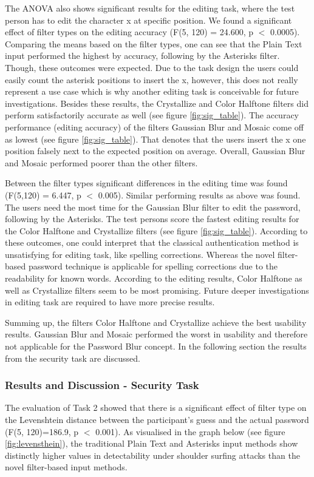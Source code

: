 \documentclass{sigchi}
\begin{document}
The ANOVA also shows significant results for the editing task, where the test person has to edit the character x at specific position. We found a significant effect of filter types on the editing accuracy (F(5, 120) = 24.600, p $<$ 0.0005). Comparing the means based on the filter types, one can see that the Plain Text input performed the highest by accuracy, following by the Asterisks filter. Though, these outcomes were expected. Due to the task design the users could easily count the asterisk positions to insert the x, however, this does not really represent a use case which is why another editing task is conceivable for future investigations. Besides these results, the Crystallize and Color Halftone filters did perform satisfactorily accurate as well (see figure \ref{fig:sig_table}). The accuracy performance (editing accuracy) of the filters Gaussian Blur and Mosaic come off as lowest (see figure \ref{fig:sig_table}). That denotes that the users insert the x one position falsely next to the expected position on average. Overall, Gaussian Blur and Mosaic performed poorer than the other filters. 

Between the filter types significant differences in the editing time was found (F(5,120) = 6.447, p $<$ 0.005). Similar performing results as above was found. The users need the most time for the Gaussian Blur filter to edit the password, following by the Asterisks. The test persons score the fastest editing results for the Color Halftone and Crystallize filters (see figure \ref{fig:sig_table}). According to these outcomes, one could interpret that the classical authentication method is unsatisfying for editing task, like spelling corrections. Whereas the novel filter-based password technique is applicable for spelling corrections due to the readability for known words. According to the editing results, Color Halftone as well as Crystallize filters seem to be most promising. Future deeper investigations in editing task are required to have more precise results. 

Summing up, the filters Color Halftone and Crystallize achieve the best usability results. Gaussian Blur and Mosaic performed the worst in usability and therefore not applicable for the Password Blur concept. In the following section the results from the security task are discussed. 

\subsubsection{Results and Discussion - Security Task}
The evaluation of Task 2 showed that there is a significant effect of filter type on the Levenshtein distance between the participant's guess and the actual password (F(5, 120)=186.9,  p $<$ 0.001). As visualised in the graph below (see figure \ref{fig:levensthein}), the traditional Plain Text and Asterisks input methods show distinctly higher values in detectability under shoulder surfing attacks than the novel filter-based input methods.
\end{document}
